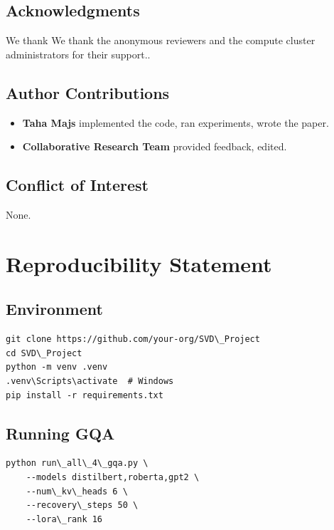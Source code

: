 \subsection{Acknowledgments}

We thank We thank the anonymous reviewers and the compute cluster administrators for their support..

\subsection{Author Contributions}

\begin{itemize}
\item \textbf{Taha Majs} implemented the code, ran experiments, wrote the paper.
\item \textbf{Collaborative Research Team} provided feedback, edited.

\end{itemize}
\subsection{Conflict of Interest}

None.


\section{Reproducibility Statement}

\subsection{Environment}

\begin{lstlisting}
git clone https://github.com/your-org/SVD\_Project
cd SVD\_Project
python -m venv .venv
.venv\Scripts\activate  # Windows
pip install -r requirements.txt
\end{lstlisting}

\subsection{Running GQA}

\begin{lstlisting}
python run\_all\_4\_gqa.py \
    --models distilbert,roberta,gpt2 \
    --num\_kv\_heads 6 \
    --recovery\_steps 50 \
    --lora\_rank 16
\end{lstlisting}

